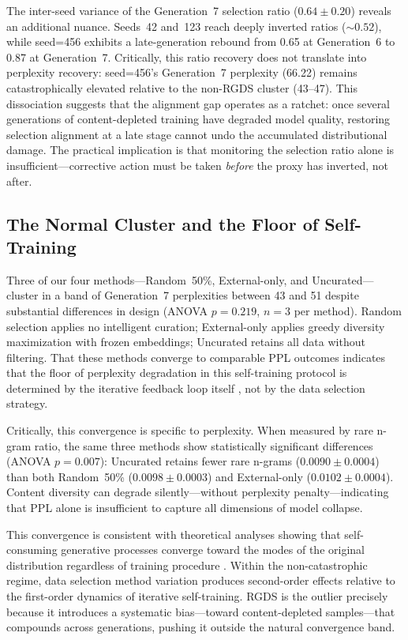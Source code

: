 The inter-seed variance of the Generation~7 selection ratio ($0.64 \pm 0.20$) reveals an additional nuance. Seeds~42 and~123 reach deeply inverted ratios (${\sim}0.52$), while seed=456 exhibits a late-generation rebound from 0.65 at Generation~6 to 0.87 at Generation~7. Critically, this ratio recovery does not translate into perplexity recovery: seed=456's Generation~7 perplexity (66.22) remains catastrophically elevated relative to the non-RGDS cluster (43--47). This dissociation suggests that the alignment gap operates as a ratchet: once several generations of content-depleted training have degraded model quality, restoring selection alignment at a late stage cannot undo the accumulated distributional damage. The practical implication is that monitoring the selection ratio alone is insufficient---corrective action must be taken \emph{before} the proxy has inverted, not after.

\subsection{The Normal Cluster and the Floor of Self-Training}

Three of our four methods---Random~50\%, External-only, and Uncurated---cluster in a band of Generation~7 perplexities between 43 and 51 despite substantial differences in design (ANOVA $p = 0.219$, $n{=}3$ per method). Random selection applies no intelligent curation; External-only applies greedy diversity maximization with frozen embeddings; Uncurated retains all data without filtering. That these methods converge to comparable PPL outcomes indicates that the floor of perplexity degradation in this self-training protocol is determined by the iterative feedback loop itself \citep{shumailov2024ai}, not by the data selection strategy.

Critically, this convergence is specific to perplexity. When measured by rare n-gram ratio, the same three methods show statistically significant differences (ANOVA $p = 0.007$): Uncurated retains fewer rare n-grams ($0.0090 \pm 0.0004$) than both Random~50\% ($0.0098 \pm 0.0003$) and External-only ($0.0102 \pm 0.0004$). Content diversity can degrade silently---without perplexity penalty---indicating that PPL alone is insufficient to capture all dimensions of model collapse.

This convergence is consistent with theoretical analyses showing that self-consuming generative processes converge toward the modes of the original distribution regardless of training procedure \citep{seddik2024how}. Within the non-catastrophic regime, data selection method variation produces second-order effects relative to the first-order dynamics of iterative self-training. RGDS is the outlier precisely because it introduces a systematic bias---toward content-depleted samples---that compounds across generations, pushing it outside the natural convergence band.

